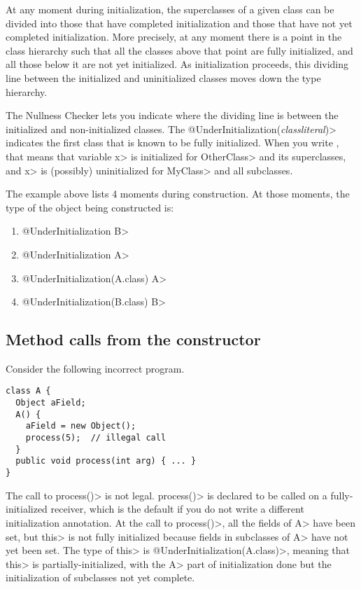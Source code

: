 At any moment during initialization, the superclasses of a given class
can be divided into those that have completed initialization and those that
have not yet completed initialization.  More precisely, at any moment there
is a point in the class hierarchy such that all the classes above that
point are fully initialized, and all those below it are not yet
initialized.  As initialization proceeds, this dividing line between the
initialized and uninitialized classes moves down the type hierarchy.

The Nullness Checker lets you indicate where the dividing line is between
the initialized and non-initialized classes.
The \<@UnderInitialization(\emph{classliteral})>
indicates the first class that is known to be fully initialized.
When you write , that
means that variable \<x> is initialized for \<OtherClass> and its
superclasses, and \<x> is (possibly) uninitialized for \<MyClass> and all subclasses.

The example above lists 4 moments during construction.  At those moments,
the type of the object being constructed is:

\begin{enumerate}
\item
  \<@UnderInitialization B>
\item
  \<@UnderInitialization A>
\item
  \<@UnderInitialization(A.class) A>
\item
  \<@UnderInitialization(B.class) B>
\end{enumerate}


\subsection{Method calls from the constructor\label{initialization-constructor}}

Consider the following incorrect program.

\begin{Verbatim}
class A {
  Object aField;
  A() {
    aField = new Object();
    process(5);  // illegal call
  }
  public void process(int arg) { ... }
}
\end{Verbatim}

The call to \<process()> is not legal.
\<process()> is declared to be called on a fully-initialized receiver, which is
the default if you do not write a different initialization annotation.
At the call to \<process()>, all the fields of \<A> have been set,
but \<this> is not fully initialized because fields in subclasses of \<A> have
not yet been set.  The type of \<this> is \<@UnderInitialization(A.class)>,
meaning that \<this> is partially-initialized, with the \<A> part of
initialization done but the initialization of subclasses not yet complete.

